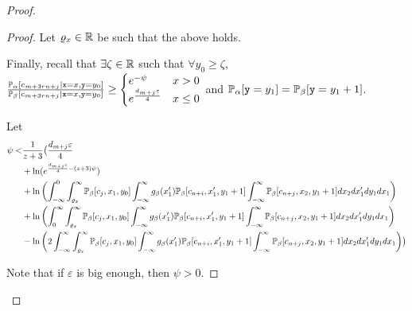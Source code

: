 \begin{proof}
\begin{proof}
		Let $\varrho_x\in\mathbb{R}$ be such that the above holds. 

		Finally, recall that $\exists \zeta\in \mathbb{R}$ such that $\forall y_0\geq \zeta$, $\frac{\mathbb{P}_\alpha[c_{m+3rn+j}|\texttt{x} = x, \texttt{y} = y_0]}{\mathbb{P}_\beta[c_{m+3rn+j}|\texttt{x} = x, \texttt{y} = y_0]}\geq \begin{cases}
			e^{-\psi} & x > 0\\
			e^{\frac{d_{m+j}\varepsilon}{4}} & x\leq 0
		\end{cases}$ and $\mathbb{P}_\alpha[\texttt{y}=y_1] = \mathbb{P}_\beta[\texttt{y}=y_1+1]$.

		Let \begin{align*}
			\psi <& \frac{1}{z+3}\bigl(\frac{d_{m+j}\varepsilon}{4}\\
			&+\ln(e^{\frac{d_{m+j}\varepsilon}{4}-(z+3)\psi})\\
			&+\ln\left(\int_{-\infty}^{0}\int_{\varrho_x}^\infty\mathbb{P}_\beta[c_{j}, x_1, y_0]\int_{-\infty}^\infty g_\beta(x_1')\mathbb{P}_\beta[c_{n+i}, x_1', y_1+1]\int_{-\infty}^\infty \mathbb{P}_\beta[c_{n+j}, x_2, y_1+1]dx_2 dx_1' dy_1dx_1\right)\\
			&+\ln\left(\int_{0}^{\infty}\int_{\varrho_x}^\infty\mathbb{P}_\beta[c_{j}, x_1, y_0]\int_{-\infty}^\infty g_\beta(x_1')\mathbb{P}_\beta[c_{n+i}, x_1', y_1+1]\int_{-\infty}^\infty \mathbb{P}_\beta[c_{n+j}, x_2, y_1+1]dx_2 dx_1' dy_1dx_1\right)\\
			&-\ln\left(2\int_{-\infty}^{\infty}\int_{\varrho_x}^\infty\mathbb{P}_\beta[c_{j}, x_1, y_0]\int_{-\infty}^\infty g_\beta(x_1')\mathbb{P}_\beta[c_{n+i}, x_1', y_1+1]\int_{-\infty}^\infty \mathbb{P}_\beta[c_{n+j}, x_2, y_1+1]dx_2 dx_1'dy_1 dx_1\right)\bigr)
		\end{align*}

		Note that if $\varepsilon$ is big enough, then $\psi >0$. 


\end{proof}
\end{proof}
